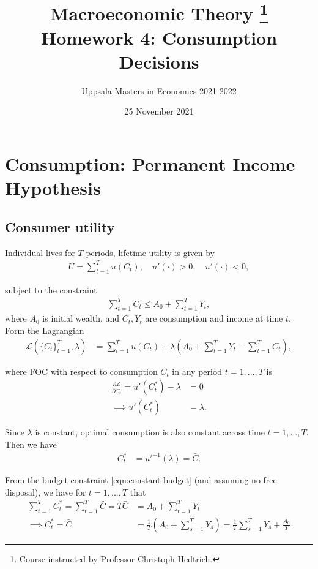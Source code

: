 \documentclass{article}
\title{ Macroeconomic Theory
        \thanks{Course instructed by Professor Christoph Hedtrich.} \\
        Homework 4: Consumption Decisions
        }
\author{
        Uppsala Masters in Economics 2021-2022
        }
\date{25 November 2021}
\renewcommand{\L}{\mathcal{L}}
\begin{document}
    
    \maketitle
    
    \section{Consumption: Permanent Income Hypothesis}
    
    \subsection{Consumer utility}
    
        Individual lives for $T$ periods, lifetime utility is given by
        \begin{align}
            U = \sum_{t=1}^T u(C_t), \quad u'(\cdot) > 0, \quad u'(\cdot) < 0,
        \end{align}
        
        subject to the constraint
        \begin{align}
            \sum_{t=1}^T C_t \le A_0 + \sum_{t=1}^T Y_t, \label{eqn:constant-budget}
        \end{align}
        where $A_0$ is initial wealth, and $C_t, Y_t$ are consumption and income at time $t$. Form the Lagrangian
        \begin{align}
            \L\left(\{C_t\}_{t=1}^{T}, \lambda\right)
            &=\sum_{t=1}^T u(C_t) + \lambda  \left(A_0 +\sum_{t=1}^T Y_t - \sum_{t=1}^T C_t \right),
        \end{align}
        
        where FOC with respect to consumption $C_t$ in any period $t = 1, ..., T$ is
        \begin{align}
            \frac{\partial \L}{\partial C_t}
            = u'(C_t^*) - \lambda
            &= 0
            \\
            \implies u'(C_t^*) &= \lambda.
        \end{align}
        
        Since $\lambda$ is constant, optimal consumption is also constant across time $t = 1, ..., T$. Then we have
        \begin{align}
            C_t^* &= {u'}^{-1}(\lambda) = \bar{C}.
        \end{align}
        
        From the budget constraint \eqref{eqn:constant-budget} (and assuming no free disposal), we have for $t = 1, ..., T$ that
        \begin{align}
            \sum_{t=1}^T C_t^*
            = \sum_{t=1}^T \bar{C}
            = T \bar{C}
            &= A_0 + \sum_{t=1}^T Y_t
            \\
            \implies
            C_t^*
            =\bar{C}
            &= \frac{1}{T} \left( A_0 + \sum_{s=1}^T Y_s \right)
            = \frac{1}{T}\sum_{s=1}^T Y_s +  \frac{A_0}{T}
        \end{align}
        
\end{document}
